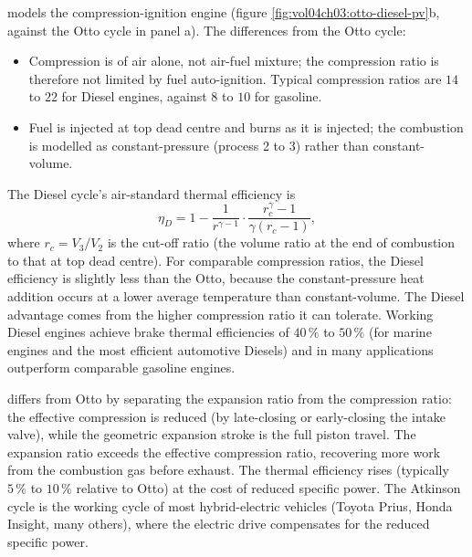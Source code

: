  models the compression-ignition engine
(figure \ref{fig:vol04ch03:otto-diesel-pv}b, against the Otto cycle in
panel a). The differences from the Otto cycle:

\begin{itemize}[leftmargin=*]
  \item Compression is of air alone, not air-fuel mixture; the
    compression ratio is therefore not limited by fuel auto-ignition.
    Typical compression ratios are $14$ to $22$ for Diesel engines,
    against $8$ to $10$ for gasoline.
  \item Fuel is injected at top dead centre and burns as it is
    injected; the combustion is modelled as constant-pressure
    (process 2 to 3) rather than constant-volume.
\end{itemize}

The Diesel cycle's air-standard thermal efficiency is
\[
\eta_D = 1 - \frac{1}{r^{\gamma-1}} \cdot \frac{r_c^\gamma - 1}{
\gamma(r_c - 1)},
\]
where $r_c = V_3/V_2$ is the cut-off ratio (the volume ratio at the
end of combustion to that at top dead centre). For comparable
compression ratios, the Diesel efficiency is slightly less than the
Otto, because the constant-pressure heat addition occurs at a lower
average temperature than constant-volume. The Diesel advantage comes
from the higher compression ratio it can tolerate. Working Diesel
engines achieve brake thermal efficiencies of $40\,\%$ to $50\,\%$
(for marine engines and the most efficient automotive Diesels) and
in many applications outperform comparable gasoline engines.

 differs from Otto by separating the
expansion ratio from the compression ratio: the effective compression
is reduced (by late-closing or early-closing the intake valve), while
the geometric expansion stroke is the full piston travel. The
expansion ratio exceeds the effective compression ratio, recovering
more work from the combustion gas before exhaust. The thermal
efficiency rises (typically $5\,\%$ to $10\,\%$ relative to Otto) at
the cost of reduced specific power. The Atkinson cycle is the working
cycle of most hybrid-electric vehicles (Toyota Prius, Honda Insight,
many others), where the electric drive compensates for the reduced
specific power.

